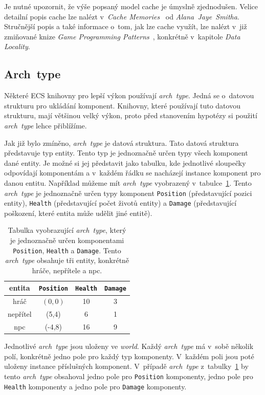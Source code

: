 Je nutné upozornit, že výše popsaný model cache je úmyslně zjednodušen. Velice detailní popis cache lze nalézt v~\textit{Cache Memories}~\cite{10.1145/356887.356892} od \textit{Alana~Jaye~Smitha}. Stručnější popis a také informace o~tom, jak lze cache využít, lze nalézt v~již zmiňované knize \textit{Game Programming Patterns}~\cite{nystrom2014game}, konkrétně v~kapitole \textit{Data Locality}. 

\subsection{Arch~type}
Některé ECS knihovny pro lepší výkon používají \textit{arch~type}. Jedná se o~datovou strukturu pro ukládání komponent. Knihovny, které používají tuto datovou strukturu, mají většinou velký výkon, proto před stanovením hypotézy si použití \textit{arch~type} lehce přiblížíme.

Jak již bylo zmíněno, \textit{arch~type} je datová struktura. Tato datová struktura představuje typ entity. Tento typ je jednoznačně určen typy všech komponent dané entity. Je možné si jej představit jako tabulku, kde jednotlivé sloupečky odpovídají komponentám a v~každém řádku se nacházejí instance komponent pro danou entitu. Například můžeme mít \textit{arch~type} vyobrazený v~tabulce~\ref{tab:arch-type}. Tento \textit{arch~type} je jednoznačně určen typy komponent \texttt{Position} (představující pozici entity), \texttt{Health} (představující počet životů entity) a \texttt{Damage} (představující poškození, které entita může udělit jiné entitě).

\begin{table}[!htb]
    \centering\footnotesize\sf
    \begin{tabular}{c c c c}
        \toprule
        entita & \texttt{Position} & \texttt{Health} & \texttt{Damage} \\
        \midrule
        hráč & $(0,0)$ & 10 & 3 \\
        nepřítel & (5,4) & 6 & 1 \\
        npc & (-4,8) & 16 & 9\\
        \bottomrule
    \end{tabular}
    \caption{Tabulka vyobrazující \textit{arch~type}, který je jednoznačně určen komponentami \texttt{Position}, \texttt{Health} a \texttt{Damage}. Tento \textit{arch~type} obsahuje tři entity, konkrétně hráče, nepřítele a npc.}
    \label{tab:arch-type}
\end{table}

Jednotlivé \textit{arch~type} jsou uloženy ve \textit{world}. Každý \textit{arch~type} má v~sobě několik polí, konkrétně jedno pole pro každý typ komponenty. V~každém poli jsou poté uloženy instance příslušných komponent. V~případě \textit{arch~type} z~tabulky~\ref{tab:arch-type} by tento \textit{arch~type} obsahoval jedno pole pro \texttt{Position} komponenty, jedno pole pro \texttt{Health} komponenty a jedno pole pro \texttt{Damage} komponenty.

